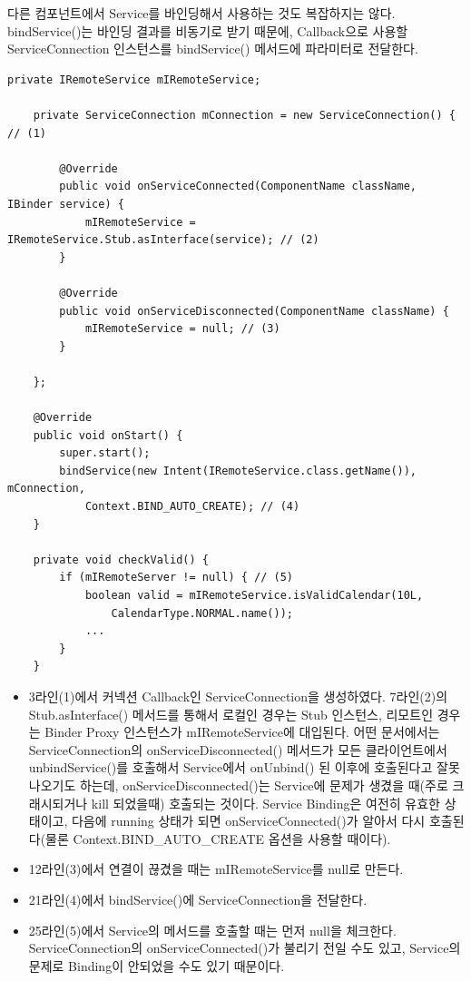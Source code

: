다른 컴포넌트에서 Service를 바인딩해서 사용하는 것도 복잡하지는 않다. 
bindService()는 바인딩 결과를 비동기로 받기 때문에, Callback으로 사용할 ServiceConnection 인스턴스를 bindService() 메서드에 파라미터로 전달한다.
\begin{lstlisting}[frame=single]
	private IRemoteService mIRemoteService;

	private ServiceConnection mConnection = new ServiceConnection() { // (1)

		@Override
    	public void onServiceConnected(ComponentName className, IBinder service) {
        	mIRemoteService = IRemoteService.Stub.asInterface(service); // (2)
    	}

    	@Override
    	public void onServiceDisconnected(ComponentName className) {
        	mIRemoteService = null; // (3)
    	}
    	
	};

	@Override
	public void onStart() {
		super.start();
		bindService(new Intent(IRemoteService.class.getName()), mConnection,
			Context.BIND_AUTO_CREATE); // (4)
	}
	
	private void checkValid() {
		if (mIRemoteServer != null) { // (5)
			boolean valid = mIRemoteService.isValidCalendar(10L,
				CalendarType.NORMAL.name());
			...
		}	
	}
\end{lstlisting}
\begin{itemize}
\item 3라인(1)에서 커넥션 Callback인 ServiceConnection을 생성하였다. 
7라인(2)의 Stub.asInter\-face() 메서드를 통해서 로컬인 경우는 Stub 인스턴스, 리모트인 경우는 Binder Proxy 인스턴스가 mIRemoteService에 대입된다.
어떤 문서에서는 ServiceConnection의 onServiceDisconnected() 메서드가 모든 클라이언트에서 unbindService()를 호출해서 Service에서 onUnbind() 된 이후에 호출된다고 잘못 나오기도 하는데, onServiceDisconnected()는 Service에 문제가 생겼을 때(주로 크래시되거나 kill 되었을때) 호출되는 것이다.
Service Binding은 여전히 유효한 상태이고, 다음에 running 상태가 되면 onServiceConnected()가 알아서 다시 호출된다(물론 Context.BIND\_AUTO\_CREATE 옵션을 사용할 때이다).

\item 12라인(3)에서 연결이 끊겼을 때는 mIRemoteService를 null로 만든다.

\item 21라인(4)에서 bindService()에 ServiceConnection을 전달한다.

\item 25라인(5)에서 Service의 메서드를 호출할 때는 먼저 null을 체크한다. ServiceConnection의 onServiceConnected()가 불리기 전일 수도 있고, Service의 문제로 Binding이 안되었을 수도 있기 때문이다.
\end{itemize}

